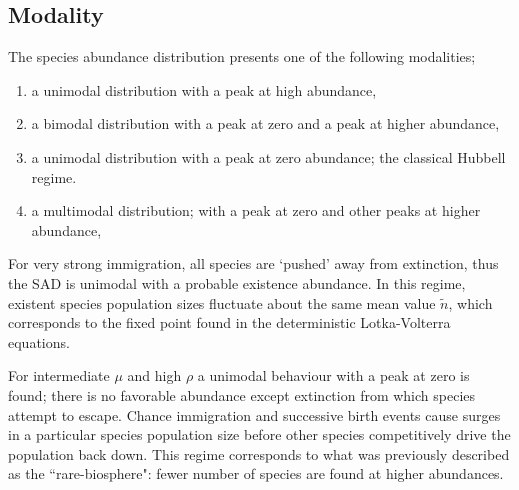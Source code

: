 \documentclass[%
 amsmath,amssymb,
reprint,%
linenumbers]{revtex4-2}
\begin{document}
\subsection{Modality}
The species abundance distribution presents one of the following modalities; 
\begin{enumerate}[label=(\Roman*)]
    \item a unimodal distribution with a peak at high abundance, 
    \item a bimodal distribution with a peak at zero and a peak at higher abundance,
    \item a unimodal distribution with a peak at zero abundance; the classical Hubbell regime.
    \item a multimodal distribution; with a peak at zero and other peaks at higher abundance,
\end{enumerate}
%
%
For very strong immigration, all species are `pushed' away from extinction, thus the SAD is unimodal with a probable existence abundance.
In this regime, existent species population sizes fluctuate about the same mean value $\tilde{n}$,  which corresponds to the fixed point found in the  deterministic Lotka-Volterra equations.

For intermediate $\mu$ and high $\rho$ a unimodal behaviour with a peak at zero is found; there is no favorable abundance except extinction from which species attempt to escape.
Chance immigration and successive birth events cause surges in a particular species population size before other species competitively drive the population back down.
This regime corresponds to what was previously described as the ``rare-biosphere": fewer number of species are found at higher abundances.
\end{document}
